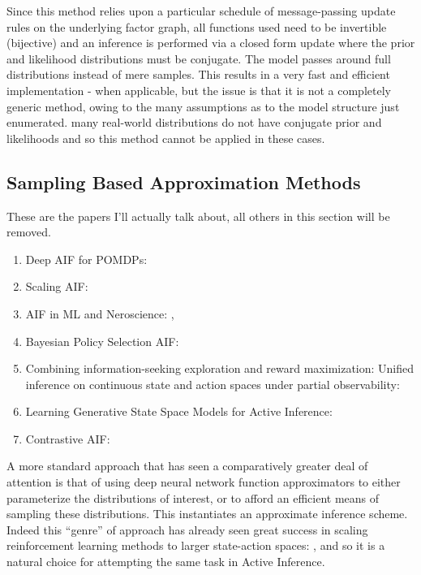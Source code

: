 \documentclass[onecolumn]{IEEEtran}
\begin{document}
Since this method relies upon a particular schedule of message-passing update rules on the underlying factor graph, all functions used need to be invertible (bijective) and an inference is performed via a closed form update where the prior and likelihood distributions must be conjugate. The model passes around full distributions instead of mere samples. This results in a very fast and efficient implementation - when applicable, but the issue is that it is not a completely generic method, owing to the many assumptions as to the model structure just enumerated. many real-world distributions do not have conjugate prior and likelihoods and so this method cannot be applied in these cases. 


\subsection{Sampling Based Approximation Methods}

These are the papers I'll actually talk about, all others in this section will be removed.

\begin{enumerate}
	\item Deep AIF for POMDPs: \textcite{DEEP-AIF-For-POMDPs}
	\item Scaling AIF: \textcite{Scaling-AIF}
	\item AIF in ML and Neroscience: \textcite{Applications-of-FEP-Machine-Learning-Neuroscience},
	\item Bayesian Policy Selection AIF: \textcite{Bayesian-Policy-Selection-AIF}
	\item Combining information-seeking exploration and reward maximization: Unified inference on continuous state and action spaces under partial observability: \textcite{Combine-Info-Seek-Explore-and-Reward-Maximization-Under-POMDP}
	\item Learning Generative State Space Models for Active Inference: \textcite{Learn-Gen-State-Space-Models-AIF}
	\item Contrastive AIF: \textcite{Contrastive-AIF}
\end{enumerate}

A more standard approach that has seen a comparatively greater deal of attention is that of using deep neural network function approximators to either parameterize the distributions of interest, or to afford an efficient means of sampling these distributions. This instantiates an approximate inference scheme. Indeed this ``genre'' of approach has already seen great success in scaling reinforcement learning methods to larger state-action spaces: \textcite{Async-Methods-Deep-RL}, \textcite{ATARI-Deep-RL} and so it is a natural choice for attempting the same task in Active Inference.
\end{document}
